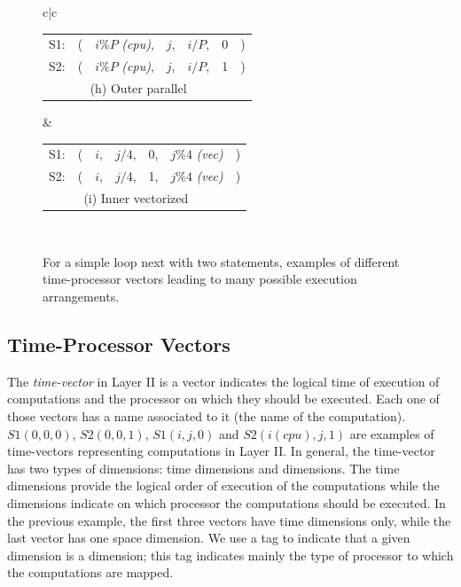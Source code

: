 \begin{figure}
\begin{tabular}{c|c}
    \begin{tabular}{l@{\hspace{4pt}}r@{\hspace{2pt}}c@{\hspace{2pt}}c@{\hspace{2pt}}c@{\hspace{2pt}}c@{\hspace{0pt}}l}
    S1: & ( & $i\%P$ {\it (cpu)}, & $j$, & $i/P$, & 0 & ) \\
    S2: & ( & $i\%P$ {\it (cpu)}, & $j$, & $i/P$, & 1 & ) \\
    \multicolumn{6}{c}{ (h) Outer parallel }
   \end{tabular} 
   &
    \begin{tabular}{l@{\hspace{4pt}}r@{\hspace{2pt}}c@{\hspace{2pt}}c@{\hspace{2pt}}c@{\hspace{2pt}}c@{\hspace{0pt}}l}
    S1: & ( & $i$, & $j/4$, & 0, & $j\%4$ {\it (vec)} & ) \\
    S2: & ( & $i$, & $j/4$, & 1, & $j\%4$ {\it (vec)} & ) \\
    \multicolumn{6}{c}{ (i) Inner vectorized }
   \end{tabular} \\ 

\end{tabular}
 \caption{For a simple loop next with two statements, examples of different time-processor vectors leading to many possible execution arrangements. }
\label{fig:time-processor-vector}
\end{figure}

\subsection{Time-Processor Vectors}

The {\it time-\processor vector} in Layer II is a vector indicates the logical time of execution of computations and the processor on which they should be executed.
Each one of those vectors has a name associated to it (the name of the computation). $S1(0,0,0)$, $S2(0,0,1)$, $S1(i,j,0)$ and $S2(i(cpu),j,1)$ are  examples of time-\processor vectors representing computations in Layer II.
In general, the  time-\processor vector has two types of dimensions: time dimensions and \processor dimensions.
The time dimensions provide the logical order of execution of the computations while the \processor dimensions indicate on which processor the computations should be executed.
In the previous example, the first three vectors have time dimensions only, while the last vector has one space dimension.
We use a tag to indicate that a given dimension is a \processor dimension; this tag indicates mainly the type of processor to which the computations are mapped.%

